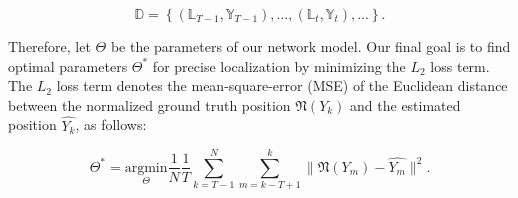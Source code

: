 \documentclass[letterpaper, 10 pt, conference]{ieeeconf}
\begin{document}
\begin{equation}
\mathbb{D} = \left\{(\mathbb{L}_{T-1}, \mathbb{Y}_{T-1}),...,(\mathbb{L}_t, \mathbb{Y}_t),...\right\}.
\end{equation}

Therefore, let $\Theta$ be the parameters of our network model. Our final goal is to find optimal parameters $\Theta^{*}$ for precise localization by minimizing the $L_2$ loss term. The $L_2$ loss term denotes the mean-square-error (MSE) of the Euclidean distance between the normalized ground truth position $\mathfrak{N}(Y_k)$ and the estimated position $\hat{Y_k}$, as follows:

\begin{equation}
\Theta^{*} = \underset{\Theta}{\mathrm{argmin}} \frac{1}{N}\frac{1}{T} \sum_{k=T-1}^N\sum_{m=k-T+1}^k \parallel \mathfrak{N}(Y_m) - \hat{Y_m} \parallel^{2}.
\end{equation}  
\end{document}
